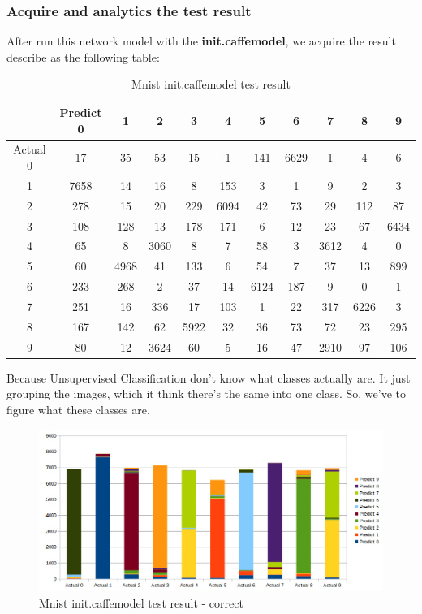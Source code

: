 \documentclass[hidelinks,12pt,a4paper]{report}
\begin{document}
\subsubsection{Acquire and analytics the test result}
After run this network model with the \textbf{init.caffemodel}, we acquire the result describe as the following table:
\begin{table}[H]
\begin{center}
\begin{tabular}{| c | c | c | c | c | c | c | c | c | c | c |}
\hline
 & Predict 0 & 1 & 2 & 3 & 4 & 5 & 6 & 7 & 8 & 9\\
\hline
Actual 0 & 17 & 35 & 53 & 15 & 1 & 141 & 6629 & 1 & 4 & 6\\
\hline
1 & 7658 & 14 & 16 & 8 & 153 & 3 & 1 & 9 & 2 & 3\\
\hline
2 & 278 & 15 & 20 & 229 & 6094 & 42 & 73 & 29 & 112 & 87\\
\hline
3 & 108 & 128 & 13 & 178 & 171 & 6 & 12 & 23 & 67 & 6434\\
\hline
4 & 65 & 8 & 3060 & 8 & 7 & 58 & 3 & 3612 & 4 & 0\\
\hline
5 & 60 & 4968 & 41 & 133 & 6 & 54 & 7 & 37 & 13 & 899\\
\hline
6 & 233 & 268 & 2 & 37 & 14 & 6124 & 187 & 9 & 0 & 1\\
\hline
7 & 251 & 16 & 336 & 17 & 103 & 1 & 22 & 317 & 6226 & 3\\
\hline
8 & 167 & 142 & 62 & 5922 & 32 & 36 & 73 & 72 & 23 & 295\\
\hline
9 & 80 & 12 & 3624 & 60 & 5 & 16 & 47 & 2910 & 97 & 106\\

\hline
\end{tabular}
\caption {Mnist init.caffemodel test result}
\end{center}
\end{table}

Because Unsupervised Classification don't know what classes actually are. It just grouping the images, which it think there's the same into one class. So, we've to figure what these classes are.

\begin{figure}[H]
\centering
\includegraphics[width=1\textwidth]{images/mnist_test_result_2}
\caption{Mnist init.caffemodel test result - correct}
\label{fig:samplepagoda}
\end{figure}
\end{document}
